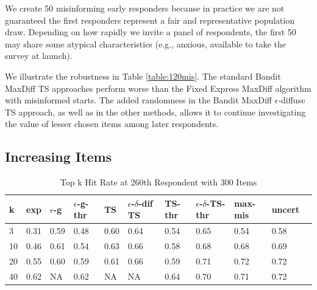 \documentclass[nonblindrev]{informs3}
\newcommand{\fixedexpressS}{\textbf{exp}}
\newcommand{\egreedyS}{$\epsilon$-\textbf{g}}
\newcommand{\egreedythresS}{$\epsilon$-\textbf{g-thr}}
\newcommand{\misminS}{\textbf{max-mis}}
\newcommand{\tsS}{\textbf{TS} }
\newcommand{\edtsS}{$\epsilon$-$\delta$-\textbf{dif TS} }
\newcommand{\tsthresS}{\textbf{TS-thr} }
\newcommand{\edtsthresS}{$\epsilon$-$\delta$-\textbf{TS-thr} }
\newcommand{\uncertS}{\textbf{uncert} }
\begin{document}
We create 50 misinforming early responders because in practice we are not guaranteed the first responders represent a fair and representative population draw. Depending on how rapidly we invite a panel of respondents, the first 50 may share some atypical characteristics (e.g., anxious, available to take the survey at launch).

We illustrate the robustness in Table \ref{table:120mis}. The standard Bandit MaxDiff TS approaches perform worse than the Fixed Express MaxDiff algorithm with misinformed starts. The added randomness in the Bandit MaxDiff $\epsilon$-diffuse TS approach, as well as in the other methods, allows it to continue investigating the value of lesser chosen items among later respondents.

\subsection{Increasing Items}
\begin{table}
\caption{Top k Hit Rate at 260th Respondent with 300 Items}
\begin{center}
\begin{tabular}{lllllllllll}
\hline   k &  \fixedexpressS & \egreedyS&\egreedythresS&\tsS&\edtsS&\tsthresS&\edtsthresS& \misminS& \uncertS \\ \hline 
3&   0.31 &   0.59 & 0.48 & 0.60 &  0.64 & 0.54 & 0.65 & 0.54 &   0.58 \\ 
10 & 0.46 &   0.61 & 0.54 & 0.63  & 0.66 & 0.58 & 0.68 & 0.68  &   0.69 \\ 
20 & 0.55 &   0.60 & 0.59 &  0.61 & 0.66 & 0.59 & 0.71 &       0.72 &   0.72\\ 
40 & 0.62 &   NA & 0.62 & NA &  NA & 0.64 & 0.70 & 0.71 & 0.72 \end{tabular}
\end{center}
\label{table:300at260}
\end{table}
\end{document}
